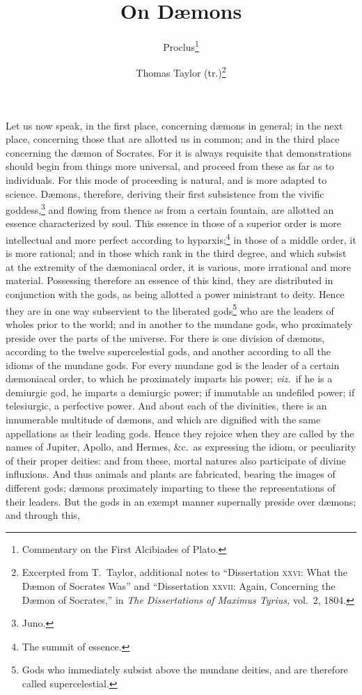 \documentclass[12pt]{article}
\title{\Huge\swshape On D{\ae}mons}
\author{Proclus\footnote{Commentary on the First Alcibiades of Plato.} \and
Thomas Taylor (tr.)\footnote{Excerpted from T.~Taylor, additional notes to
``Dissertation \textsc{xxvi}: What the D{\ae}mon of Socrates Was'' and
``Dissertation \textsc{xxvii}: Again, Concerning the D{\ae}mon of Socrates,''
in \textit{The Dissertations of Maximus Tyrius,} vol.~2, 1804.}}
\date{}
\begin{document}
\maketitle

\noindent Let us now speak, in the first place, concerning d{\ae}mons in
general; in the next place, concerning those that are allotted us in common;
and in the third place concerning the d{\ae}mon of Socrates. For it is always
requisite that demonstrations should begin from things more universal, and
proceed from these as far as to individuals. For this mode of proceeding is
natural, and is more adapted to science. D{\ae}mons, therefore, deriving their
first subsistence from the vivific goddess,\footnote{Juno.} and flowing from
thence as from a certain fountain, are allotted an essence characterized by
soul. This essence in those of a superior order is more intellectual and more
perfect according to hyparxis;\footnote{The summit of essence.} in those of a
middle order, it is more rational; and in those which rank in the third degree,
and which subsist at the extremity of the d{\ae}moniacal order, it is various,
more irrational and more material. Possessing therefore an essence of this
kind, they are distributed in conjunction with the gods, as being allotted a
power ministrant to deity. Hence they are in one way subservient to the
liberated gods\footnote{Gods who immediately subsist above the mundane deities,
and are therefore called supercelestial.} who are the leaders of wholes prior
to the world; and in another to the mundane gods, who proximately preside over
the parts of the universe. For there is one division of d{\ae}mons, according
to the twelve supercelestial gods, and another according to all the idioms of
the mundane gods. For every mundane god is the leader of a certain
d{\ae}moniacal order, to which he proximately imparts his power;
\textit{viz.}~if he is a demiurgic god, he imparts a demiurgic power; if
immutable an undefiled power; if telesiurgic, a perfective power. And about
each of the divinities, there is an innumerable multitude of d{\ae}mons, and
which are dignified with the same appellations as their leading gods. Hence
they rejoice when they are called by the names of Jupiter, Apollo, and Hermes,
\&c.~as expressing the idiom, or peculiarity of their proper deities: and from
these, mortal natures also participate of divine influxions. And thus animals
and plants are fabricated, bearing the images of different gods; d{\ae}mons
proximately imparting to these the representations of their leaders. But the
gods in an exempt manner supernally preside over d{\ae}mons; and through this,
\end{document}
